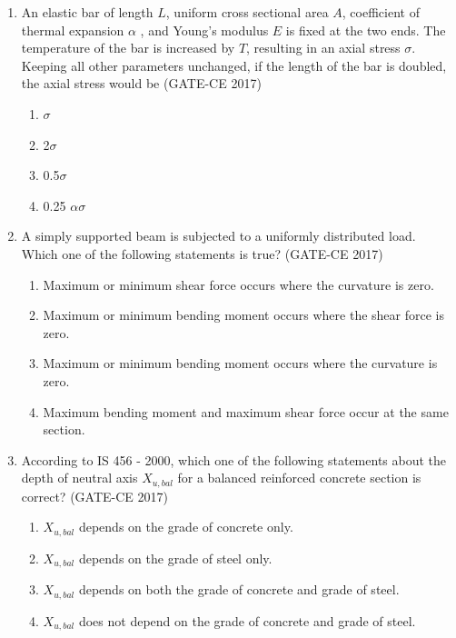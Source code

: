\documentclass[journal,12pt,onecolumn]{article}
\theoremstyle{remark}
\begin{document}
\begin{enumerate}
    \item An elastic bar of length $L$, uniform cross sectional area $A$, coefficient of thermal expansion $\alpha$ , and Young's modulus $E$ is fixed at the two ends. The temperature of the bar is increased by $T$, resulting in an axial stress $\sigma$. Keeping all other parameters unchanged, if the length of the bar is doubled, the axial stress would be \hfill (GATE-CE 2017)
    \begin{multicols}{4}
    \begin{enumerate}
        \item $\sigma$
        \item 2$\sigma$
        \item 0.5$\sigma$
        \item 0.25 $\alpha \sigma$
    \end{enumerate}
    \end{multicols}

    \item A simply supported beam is subjected to a uniformly distributed load. \\
    Which one of the following statements is true? \hfill (GATE-CE 2017)
    \begin{enumerate}
        \item Maximum or minimum shear force occurs where the curvature is zero.
        \item Maximum or minimum bending moment occurs where the shear force is zero.
        \item Maximum or minimum bending moment occurs where the curvature is zero.
        \item Maximum bending moment and maximum shear force occur at the same section.
    \end{enumerate}

    \item According to IS 456 - 2000, which one of the following statements about the depth of neutral axis $X_{u,bal}$ for a balanced reinforced concrete section is correct? \hfill (GATE-CE 2017)
    \begin{enumerate}
        \item $X_{u,bal}$ depends on the grade of concrete only.
        \item $X_{u,bal}$ depends on the grade of steel only.
        \item $X_{u,bal}$ depends on both the grade of concrete and grade of steel.
        \item $X_{u,bal}$ does not depend on the grade of concrete and grade of steel.
    \end{enumerate}


\end{enumerate}
\end{document}
